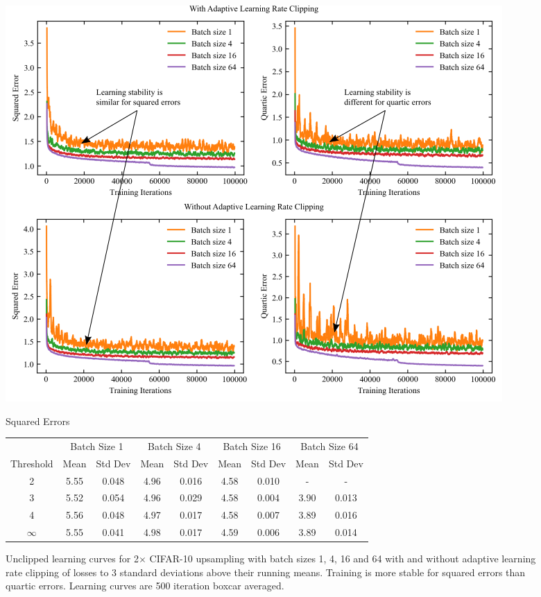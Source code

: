 \documentclass[letterpaper, 10 pt, conference]{ieeeconf}  %
\begin{document}
\begin{figure}[tbh!]
\vspace{0.7cm}
{\centering
\includegraphics[width=\textwidth]{alrc.png}
\caption{ Unclipped learning curves for 2$\times$ CIFAR-10 upsampling with batch sizes 1, 4, 16 and 64 with and without adaptive learning rate clipping of losses to 3 standard deviations above their running means. Training is more stable for squared errors than quartic errors. Learning curves are 500 iteration boxcar averaged. }
\label{fig:alrc}}
\footnotesize
\vspace{\baselineskip}
Squared Errors\\
\begin{tabular*}{\textwidth}{@{\extracolsep{\fill}}c|cccccccc}
\hline
\multicolumn{1}{c|}{}       & \multicolumn{2}{c}{Batch Size 1} & \multicolumn{2}{c}{Batch Size 4} & \multicolumn{2}{c}{Batch Size 16} & \multicolumn{2}{c}{Batch Size 64} \\
Threshold & Mean         & \multicolumn{1}{c}{Std Dev}      & Mean       & Std Dev      & Mean       & \multicolumn{1}{c}{Std Dev}       & Mean      & Std Dev      \\ \hline
2 & 5.55 & 0.048 & 4.96 & 0.016 & 4.58 & 0.010 & - & - \\
3 & 5.52 & 0.054 & 4.96 & 0.029 & 4.58 & 0.004 & 3.90 & 0.013 \\
4 & 5.56 & 0.048 & 4.97 & 0.017 & 4.58 & 0.007 & 3.89 & 0.016 \\
$\infty$ & 5.55 & 0.041 & 4.98 & 0.017 & 4.59 & 0.006 & 3.89 & 0.014 \\
\hline
\end{tabular*}
\vspace{\baselineskip}


\end{figure}
\end{document}
